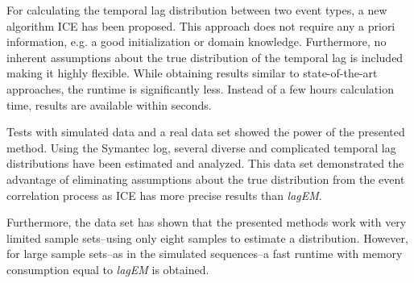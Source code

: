 \documentclass[conference]{IEEEtran}
\theoremstyle{examplestyle}
\begin{document}
For calculating the temporal lag distribution between two event types, a new algorithm \ac{ICE} has been proposed. This approach does not require any a priori information, e.g. a good initialization or domain knowledge. Furthermore, no inherent assumptions about the true distribution of the temporal lag is included making it highly flexible. While obtaining results similar to state-of-the-art approaches, the runtime is significantly less. Instead of a few hours calculation time, results are available within seconds.

Tests with simulated data and a real data set showed the power of the presented method. Using the Symantec log, several diverse and complicated temporal lag distributions have been estimated and analyzed. This data set demonstrated the advantage of eliminating assumptions about the true distribution from the event correlation process as \ac{ICE} has  more precise results than \textit{lagEM}.

Furthermore, the data set has shown that the presented methods work with very limited sample sets--using only eight samples to estimate a distribution. However, for large sample sets--as in the simulated sequences--a fast runtime with memory consumption equal to \textit{lagEM} is obtained.





% 
% 










\end{document}
